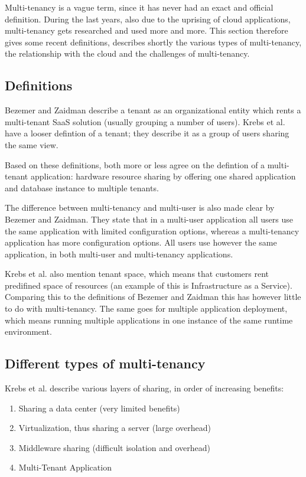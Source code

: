 Multi-tenancy is a vague term, since it has never had an exact and official definition. During the last years, also due to the uprising of cloud applications, multi-tenancy gets researched and used more and more. This section therefore gives some recent definitions, describes shortly the various types of multi-tenancy, the relationship with the cloud and the challenges of multi-tenancy.

\subsection{Definitions}

Bezemer and Zaidman\cite{bezemer2010multi} describe a tenant as an organizational entity which rents a multi-tenant SaaS solution (usually grouping a number of users). Krebs et al.\cite{krebs2012architecture} have a looser defintion of a tenant; they describe it as a group of users sharing the same view.

Based on these definitions, both more or less agree on the defintion of a multi-tenant application: hardware resource sharing by offering one shared application and database instance to multiple tenants.

The difference between multi-tenancy and multi-user is also made clear by Bezemer and Zaidman\cite{bezemer2010multi}. They state that in a multi-user application all users use the same application with limited configuration options, whereas a multi-tenancy application has more configuration options. All users use however the same application, in both multi-user and multi-tenancy applications.

Krebs et al.\cite{krebs2012architecture} also mention tenant space, which means that customers rent predifined space of resources (an example of this is Infrastructure as a Service). Comparing this to the definitions of Bezemer and Zaidman\cite{bezemer2010multi} this has however little to do with multi-tenancy. The same goes for multiple application deployment, which means running multiple applications in one instance of the same runtime environment.

\subsection{Different types of multi-tenancy}

Krebs et al.\cite{krebs2012architecture} describe various layers of sharing, in order of increasing benefits:
\begin{enumerate}
\item Sharing a data center (very limited benefits)
\item Virtualization, thus sharing a server (large overhead)
\item Middleware sharing (difficult isolation and overhead)
\item Multi-Tenant Application
\end{enumerate}

